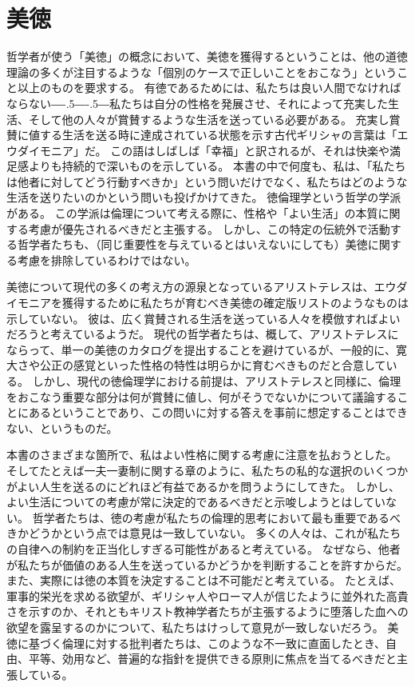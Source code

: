 \documentclass[paper=a4,book,openany]{jlreq}
\def\DDASH{―\kern-.5\zw―\kern-.5\zw―} %
\begin{document}
\section{美徳}

哲学者が使う「美徳」の概念において、美徳を獲得するということは、他の道徳理論の多くが注目するような「個別のケースで正しいことをおこなう」ということ以上のものを要求する。
有徳であるためには、私たちは良い人間でなければならない{\DDASH}私たちは自分の性格を発展させ、それによって充実した生活、そして他の人々が賞賛するような生活を送っている必要がある。
充実し賞賛に値する生活を送る時に達成されている状態を示す古代ギリシャの言葉は「エウダイモニア」だ。
この語はしばしば「幸福」と訳されるが、それは快楽や満足感よりも持続的で深いものを示している。
本書の中で何度も、私は、「私たちは他者に対してどう行動すべきか」という問いだけでなく、私たちはどのような生活を送りたいのかという問いも投げかけてきた。
徳倫理学という哲学の学派がある。
この学派は倫理について考える際に、性格や「よい生活」の本質に関する考慮が優先されるべきだと主張する。
しかし、この特定の伝統外で活動する哲学者たちも、（同じ重要性を与えているとはいえないにしても）美徳に関する考慮を排除しているわけではない。

美徳について現代の多くの考え方の源泉となっているアリストテレスは、エウダイモニアを獲得するために私たちが育むべき美徳の確定版リストのようなものは示していない。
彼は、広く賞賛される生活を送っている人々を模倣すればよいだろうと考えているようだ。
現代の哲学者たちは、概して、アリストテレスにならって、単一の美徳のカタログを提出することを避けているが、一般的に、寛大さや公正の感覚といった性格の特性は明らかに育むべきものだと合意している。
しかし、現代の徳倫理学における前提は、アリストテレスと同様に、倫理をおこなう重要な部分は何が賞賛に値し、何がそうでないかについて議論することにあるということであり、この問いに対する答えを事前に想定することはできない、というものだ。

本書のさまざまな箇所で、私はよい性格に関する考慮に注意を払おうとした。
そしてたとえば一夫一妻制に関する章のように、私たちの私的な選択のいくつかがよい人生を送るのにどれほど有益であるかを問うようにしてきた。
しかし、よい生活についての考慮が常に決定的であるべきだと示唆しようとはしていない。
哲学者たちは、徳の考慮が私たちの倫理的思考において最も重要であるべきかどうかという点では意見は一致していない。
多くの人々は、これが私たちの自律への制約を正当化しすぎる可能性があると考えている。
なぜなら、他者が私たちが価値のある人生を送っているかどうかを判断することを許すからだ。
また、実際には徳の本質を決定することは不可能だと考えている。
たとえば、軍事的栄光を求める欲望が、ギリシャ人やローマ人が信じたように並外れた高貴さを示すのか、それともキリスト教神学者たちが主張するように堕落した血への欲望を露呈するのかについて、私たちはけっして意見が一致しないだろう。
美徳に基づく倫理に対する批判者たちは、このような不一致に直面したとき、自由、平等、効用など、普遍的な指針を提供できる原則に焦点を当てるべきだと主張している。
\end{document}
